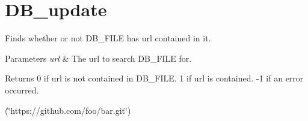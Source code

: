 \hypertarget{DB_update-example}{}\section{D\+B\+\_\+update}
Finds whether or not D\+B\+\_\+\+F\+I\+L\+E has url contained in it. 
\begin{DoxyParams}{Parameters}
{\em url} & The url to search D\+B\+\_\+\+F\+I\+L\+E for.\\
\hline
\end{DoxyParams}
\begin{DoxyReturn}{Returns}
0 if url is not contained in D\+B\+\_\+\+F\+I\+L\+E. 1 if url is contained. -\/1 if an error occurred. 
\end{DoxyReturn}


(\char`\"{}https\+://github.\+com/foo/bar.\+git\char`\"{})


\begin{DoxyCodeInclude}
\end{DoxyCodeInclude}
 